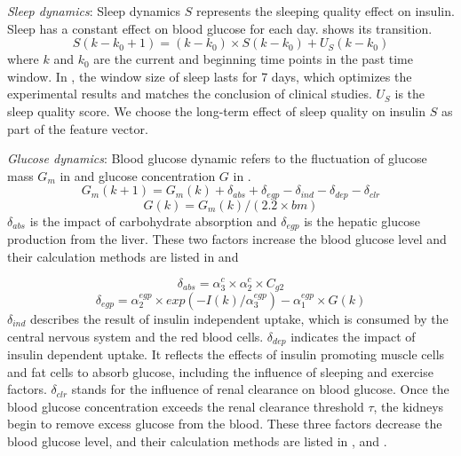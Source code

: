 {\textit{Sleep dynamics}:
Sleep dynamics $S$ represents the sleeping quality effect on insulin.
Sleep has a constant effect on blood glucose for each day.
 shows its transition.
\begin{equation}\label{Eq:S}
S(k-k_0+1)=(k-k_0) \times S(k-k_0)+U_{S}(k-k_0)
\end{equation}
where $k$ and $k_0$ are the current and beginning time points in the past time window.
In \sysname, the window size of sleep lasts for 7 days, which optimizes the experimental results and matches the conclusion of clinical studies. $U_{S}$ is the sleep quality score.
We choose the long-term effect of sleep quality on insulin $S$ as part of the feature vector.

\textit{Glucose dynamics}:
Blood glucose dynamic refers to the fluctuation of glucose mass $G_m$ in  and glucose concentration $G$ in .
\begin{equation}\label{Eq:Gm}
G_m(k+1)=G_m(k)+\delta_{abs}+\delta_{egp}-\delta_{ind}-\delta_{dep}-\delta_{clr}
\end{equation}
\begin{equation}\label{Eq:G}
G(k)=G_m(k)/(2.2 \times bm)
\end{equation}
$\delta_{abs}$ is the impact of carbohydrate absorption and $\delta_{egp}$ is the hepatic glucose production from the liver. These two factors increase the blood glucose level and their calculation methods are listed in  and  

\begin{equation}\label{Eq:abs}
  \delta_{abs}=\alpha_3^c \times \alpha_2^c \times C_{g2}
\end{equation}
\begin{equation}\label{Eq:egp}
  \delta_{egp}=\alpha_2^{egp} \times exp(-I(k)/\alpha_3^{egp})-\alpha_1^{egp} \times G(k)
\end{equation}
$\delta_{ind}$ describes the result of insulin independent uptake, which is consumed by the central nervous system and the red blood cells.
$\delta_{dep}$ indicates the impact of insulin dependent uptake.
It reflects the effects of insulin promoting muscle cells and fat cells to absorb glucose, including the influence of sleeping and exercise factors.
$\delta_{clr}$ stands for the influence of renal clearance on blood glucose. Once the blood glucose concentration exceeds the renal clearance threshold $\tau$, the kidneys begin to remove excess glucose from the blood. 
These three factors decrease the blood glucose level, and their
calculation methods are listed in ,  and .

}
